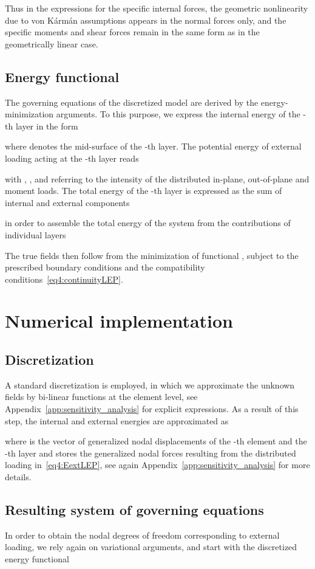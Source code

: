 \documentclass[11pt]{article}
\begin{document}
Thus in the expressions for the specific internal forces, the geometric nonlinearity due to von K\'{a}rm\'{a}n assumptions appears in the normal
forces only, and the specific moments and shear forces remain in the same form as in the geometrically linear case. 

\subsection{Energy functional}\label{sec:energy}
The governing equations of the discretized model are derived by the energy-minimization arguments. To this purpose, we express the internal energy of the -th layer in the form 

where  denotes the mid-surface of the -th layer. The potential energy of external loading acting at the -th layer reads

with , , and  referring to the intensity of the distributed
in-plane, out-of-plane and moment loads. The total energy of the -th layer is expressed as the sum of internal and external components

in order to assemble the total energy of the system from the contributions of individual layers

The true fields  then follow from the minimization of functional
, subject to the prescribed boundary conditions and the compatibility conditions~\eqref{eq4:continuityLEP}.

\section{Numerical implementation}\label{sec:implementation} 


\subsection{Discretization}\label{sec:discretization}
A standard discretization is employed, in which we approximate the unknown fields by bi-linear functions at the element
level, see Appendix~\ref{app:sensitivity_analysis}  for explicit expressions. 
As a result of this step, the internal and external energies are approximated as 

where  is the vector of generalized nodal displacements of
the -th element and the -th layer
and  stores the generalized nodal forces resulting from the distributed loading in~\eqref{eq4:EextLEP}, see again Appendix~\ref{app:sensitivity_analysis} for more details.

\subsection{Resulting system of governing equations}\label{sec:governing}
In order to obtain the nodal degrees of freedom corresponding to external loading, we rely again on
variational arguments, and start with the discretized energy functional
\end{document}
